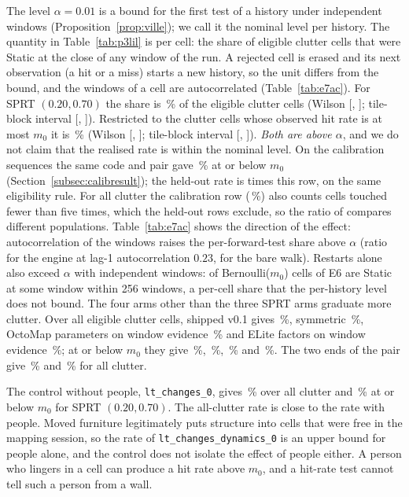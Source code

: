 The level $\alpha=0.01$ is a bound for the first test of a history under independent windows (Proposition~\ref{prop:ville}); we call it the nominal level per history. The quantity in Table~\ref{tab:p3lil} is per cell: the share of eligible clutter cells that were Static at the close of any window of the run. A rejected cell is erased and its next observation (a hit or a miss) starts a new history, so the unit differs from the bound, and the windows of a cell are autocorrelated (Table~\ref{tab:e7ac}). For SPRT $(0.20,0.70)$ the share is \PtLilAllSprt\,\% of the \PtLilEligible{} eligible clutter cells (Wilson [\PtLilAllLo, \PtLilAllHi]; tile-block interval [\PtLilBlockLo, \PtLilBlockHi]). Restricted to the \PtLilLeN{} clutter cells whose observed hit rate is at most $m_0$ it is \PtLilLeSprt\,\% (Wilson [\PtLilLeLo, \PtLilLeHi]; tile-block interval [\PtLilLeBlockLo, \PtLilLeBlockHi]). \emph{Both are above $\alpha$}, and we do not claim that the realised rate is within the nominal level. On the calibration sequences the same code and pair gave \CalRepLe\,\% at or below $m_0$ (Section~\ref{subsec:calibresult}); the held-out rate is \PtRatioLe{} times this row, on the same eligibility rule. For all clutter the calibration row (\CalRepAll\,\%) also counts cells touched fewer than five times, which the held-out rows exclude, so the ratio of \PtRatioAll{} compares different populations. Table~\ref{tab:e7ac} shows the direction of the effect: autocorrelation of the windows raises the per-forward-test share above $\alpha$ (ratio \SqAcTw{} for the engine at lag-1 autocorrelation $0.23$, \SqRefWalk{} for the bare walk). Restarts alone also exceed $\alpha$ with independent windows: \SqEsixEverTw{} of \SqCellsAperiodic{} Bernoulli($m_0$) cells of E6 are Static at some window within 256 windows, a per-cell share that the per-history level does not bound. The four arms other than the three SPRT arms graduate more clutter. Over all eligible clutter cells, shipped v0.1 gives \PtLilAllShipped\,\%, symmetric \PtLilAllSymm\,\%, OctoMap parameters on window evidence \PtLilAllOcto\,\% and ELite factors on window evidence \PtLilAllElite\,\%; at or below $m_0$ they give \PtLilLeShipped\,\%, \PtLilLeSymm\,\%, \PtLilLeOcto\,\% and \PtLilLeElite\,\%. The two ends of the pair give \PtLilAllLow\,\% and \PtLilAllHigh\,\% for all clutter.

The control without people, \texttt{lt\_changes\_0}, gives \PtCtlAllSprt\,\% over all clutter and \PtCtlLeSprt\,\% at or below $m_0$ for SPRT $(0.20,0.70)$. The all-clutter rate is close to the rate with people. Moved furniture legitimately puts structure into cells that were free in the mapping session, so the rate of \texttt{lt\_changes\_dynamics\_0} is an upper bound for people alone, and the control does not isolate the effect of people either. A person who lingers in a cell can produce a hit rate above $m_0$, and a hit-rate test cannot tell such a person from a wall.

